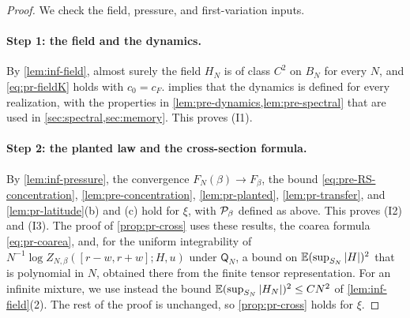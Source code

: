 \begin{proof}
We check the field, pressure, and first-variation inputs.

\paragraph{Step 1: the field and the dynamics.} By \cref{lem:inf-field}, almost surely the field $H_N$ is of class $C^2$ on $B_N$ for every $N$, and \eqref{eq:pr-fieldK} holds with $c_0=c_F$.  implies that the dynamics is defined for every realization, with the properties in \cref{lem:pre-dynamics,lem:pre-spectral} that are used in \cref{sec:spectral,sec:memory}. This proves (I1).

\paragraph{Step 2: the planted law and the cross-section formula.} By \cref{lem:inf-pressure}, the convergence $F_N(\beta)\to F_\beta$, the bound \eqref{eq:pre-RS-concentration}, \cref{lem:pre-concentration}, \cref{lem:pr-planted}, \cref{lem:pr-transfer}, and \cref{lem:pr-latitude}(b) and (c) hold for $\xi$, with $\mathcal P_\beta$ defined as above. This proves (I2) and (I3). The proof of \cref{prop:pr-cross} uses these results, the coarea formula \eqref{eq:pr-coarea}, and, for the uniform integrability of $N^{-1}\log Z_{N,\beta}([r-w,r+w];H,u)$ under $\mathsf Q_N$, a bound on $\mathbb E(\sup_{S_N}|H|)^2$ that is polynomial in $N$, obtained there from the finite tensor representation. For an infinite mixture, we use instead the bound $\mathbb E(\sup_{S_N}|H_N|)^2\le CN^2$ of \cref{lem:inf-field}(2). The rest of the proof is unchanged, so \cref{prop:pr-cross} holds for $\xi$.


\end{proof}
